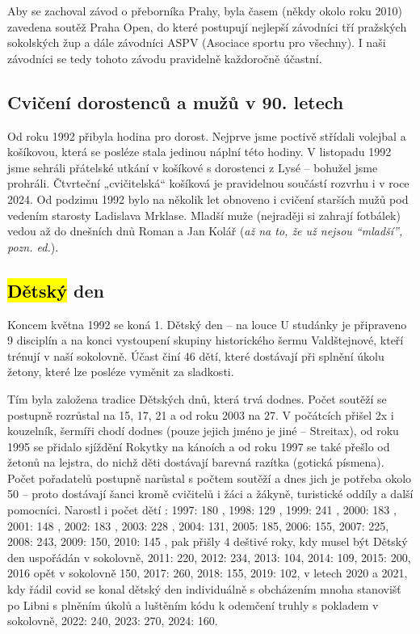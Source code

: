 Aby se zachoval závod o přeborníka Prahy, byla časem (někdy okolo roku
2010) zavedena soutěž Praha Open, do které postupují nejlepší závodníci
tří pražských sokolských žup a dále závodníci ASPV (Asociace sportu pro
všechny). I naši závodníci se tedy tohoto závodu pravidelně každoročně
účastní.

\subsection{Cvičení dorostenců a mužů v 90.
letech}\label{cviux10denuxed-dorostencux16f-a-muux17eux16f-v-90.-letech}

Od roku 1992 přibyla hodina pro dorost. Nejprve jsme poctivě střídali
volejbal a košíkovou, která se posléze stala jedinou náplní této hodiny.
V listopadu 1992 jsme sehráli přátelské utkání v košíkové s dorostenci z
Lysé -- bohužel jsme prohráli. Čtvrteční „cvičitelská`` košíková je
pravidelnou součástí rozvrhu i v roce 2024. Od podzimu 1992 bylo na
několik let obnoveno i cvičení starších mužů pod vedením starosty
Ladislava Mrklase. Mladší muže (nejraději si zahrají fotbálek) vedou až
do dnešních dnů Roman a Jan Kolář (\emph{až na to, že už nejsou
``mladší'', pozn. ed.}).

\subsection{\texorpdfstring{\hl{Dětský}
den}{Dětský den}}\label{dux11btskuxfd-den}

Koncem května 1992 se koná 1. Dětský den -- na louce U studánky je
připraveno 9 disciplín a na konci vystoupení skupiny historického šermu
Valdštejnové, kteří trénují v naší sokolovně. Účast činí 46 dětí, které
dostávají při splnění úkolu žetony, které lze posléze vyměnit za
sladkosti.

Tím byla založena tradice Dětských dnů, která trvá dodnes. Počet soutěží
se postupně rozrůstal na 15, 17, 21 a od roku 2003 na 27. V počátcích
přišel 2x i kouzelník, šermíři chodí dodnes (pouze jejich jméno je jiné
-- Streitax), od roku 1995 se přidalo sjíždění Rokytky na kánoích a od
roku 1997 se také přešlo od žetonů na lejstra, do nichž děti dostávají
barevná razítka (gotická písmena). Počet pořadatelů postupně narůstal s
počtem soutěží a dnes jich je potřeba okolo 50 -- proto dostávají šanci
kromě cvičitelů i žáci a žákyně, turistické oddíly a další pomocníci.
Narostl i počet dětí : 1997: 180 , 1998: 129 , 1999: 241 , 2000: 183 ,
2001: 148 , 2002: 183 , 2003: 228 , 2004: 131, 2005: 185, 2006: 155,
2007: 225, 2008: 243, 2009: 150, 2010: 145 , pak přišly 4 deštivé roky,
kdy musel být Dětský den uspořádán v sokolovně, 2011: 220, 2012: 234,
2013: 104, 2014: 109, 2015: 200, 2016 opět v sokolovně 150, 2017: 260,
2018: 155, 2019: 102, v letech 2020 a 2021, kdy řádil covid se konal
dětský den individuálně s obcházením mnoha stanovišť po Libni s plněním
úkolů a luštěním kódu k odemčení truhly s pokladem v sokolovně, 2022:
240, 2023: 270, 2024: 160.

